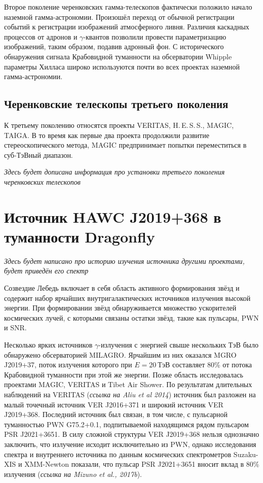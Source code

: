 \documentclass[magd,floatypics,numeref]{msudipl} %
\begin{document}
Второе поколение черенковских гамма-телескопов фактически положило начало наземной гамма-астрономии. Произошёл переход от обычной регистрации событий к регистрации изображений атмосферного ливня. Различия каскадных процессов от адронов и $\gamma$-квантов позволили провести параметризацию изображений, таким образом, подавив адронный фон. С исторического обнаружения сигнала Крабовидной туманности на обсерватории Whipple параметры Хилласа широко используются почти во всех проектах наземной гамма-астрономии.
\subsection{Черенковские телескопы третьего поколения}
К третьему поколению относятся проекты VERITAS, H.\,E.\,S.\,S., MAGIC, TAIGA. В то время как первые два проекта продолжили развитие стереоскопического метода, MAGIC предпринимает попытки переместиться в суб-ТэВный диапазон. 

\textit{Здесь будет дописана информация про установки третьего поколения черенковских телескопов}
\section{Источник HAWC J2019+368 в туманности Dragonfly}
\textit{Здесь будет написано про историю изучения источника другими проектами, будет приведён его спектр}

Созвездие Лебедь включает в себя область активного формирования звёзд и содержит набор ярчайших внутригалактических источников излучения высокой энергии. При формировании звёзд обнаруживается множество ускорителей космических лучей, с которыми связаны остатки звёзд, такие как пульсары, PWN и SNR. 

Несколько ярких источников $\gamma$-излучения с энергией свыше нескольких ТэВ было обнаружено обсерваторией MILAGRO. Ярчайшим из них оказался MGRO J2019+37, поток излучения которого при $E=20~\text{ТэВ}$ составляет 80\% от потока Крабовидной туманности при этой же энергии. Позже область исследовалась проектами MAGIC, VERITAS и Tibet Air Shower. По результатам длительных  наблюдений на VERITAS (\textit{ссылка на Aliu et al 2014}) источник был разложен на малый точечный источник VER J2016+371 и широкий источник VER J2019+368. Последний источник был связан, в том числе, с пульсарной туманностью PWN G75.2+0.1, подпитываемой находящимся рядом пульсаром PSR J2021+3651. В силу сложной структуры VER J2019+368 нельзя однозначно заключить, что излучение исходит исключительно из PWN, однако исследования спектра и внутреннего источника  по данным космических спектрометров Suzaku-XIS и XMM-Newton показали, что пульсар PSR J2021+3651 вносит вклад в 80\% излучения (\textit{ссылка на Mizuno et al., 2017b}). 
\end{document}
